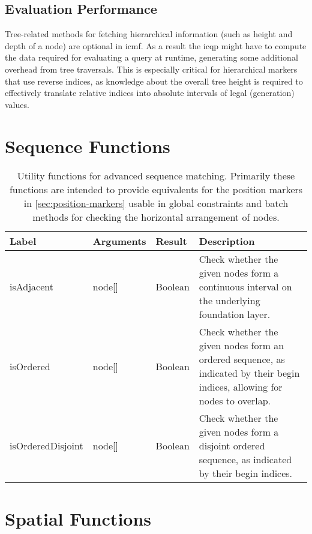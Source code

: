 \documentclass[11pt,a4paper]{report}
\begin{document}
\subsection{Evaluation Performance}
\label{sec:hierarchy-markers-performance}
Tree-related methods for fetching hierarchical information (such as height and depth of a node) are optional in \ac{icmf}.
As a result the \ac{icqp} might have to compute the data required for evaluating a query at runtime, generating some additional overhead from tree traversals. 
This is especially critical for hierarchical markers that use reverse indices, as knowledge about the overall tree height is required to effectively translate relative indices into absolute intervals of legal (generation) values.

\section{Sequence Functions}
\label{sec:sequence-functions}

\begin{table}[!htb]\centering
	\begin{tabular}{|p{}|p{}|p{}|p{}|}
		\hline 
		\textbf{Label} & \textbf{Arguments} & \textbf{Result} & Description \\ 
		\hline 
		\hline  
		isAdjacent & node[] & Boolean & Check whether the given nodes form a continuous interval on the underlying foundation layer. \\ 
		\hline  
		isOrdered & node[] & Boolean & Check whether the given nodes form an ordered sequence, as indicated by their begin indices, allowing for nodes to overlap. \\ 
		\hline  
		isOrderedDisjoint & node[] & Boolean & Check whether the given nodes form a disjoint ordered sequence, as indicated by their begin indices. \\ 
		\hline 
	\end{tabular}
	\caption[Sequence functions]{Utility functions for advanced sequence matching. Primarily these functions are intended to provide equivalents for the position markers in \cref{sec:position-markers} usable in global constraints and batch methods for checking the horizontal arrangement of nodes.}
	\label{tab:sequence-functions}
\end{table}

\section{Spatial Functions}
\label{sec:relative-markers}
\end{document}
